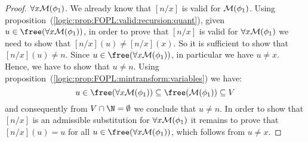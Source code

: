 \begin{proof}
$\forall x{\cal M}(\phi_{1})$. We already know that $[n/x]$ is valid
for ${\cal M}(\phi_{1})$. Using
proposition~(\ref{logic:prop:FOPL:valid:recursion:quant}), given
$u\in\free(\forall x{\cal M}(\phi_{1}))$, in order to prove that
$[n/x]$ is valid for $\forall x{\cal M}(\phi_{1})$ we need to show
that $[n/x](u)\neq[n/x](x)$. So it is sufficient to show that
$[n/x](u)\neq n$. Since $u\in\free(\forall x{\cal M}(\phi_{1}))$, in
particular we have $u\neq x$. Hence, we have to show that $u\neq n$.
Using proposition~(\ref{logic:prop:FOPL:mintransform:variables}) we
have:
    \[
    u\in\free(\forall x{\cal M}(\phi_{1}))\subseteq\free({\cal M}(\phi_{1}))\subseteq V
    \]
and consequently from $V\cap\N=\emptyset$ we conclude that $u\neq
n$. In order to show that  $[n/x]$ is an admissible substitution for
$\forall x{\cal M}(\phi_{1})$ it remains to prove that $[n/x](u)=u$
for all $u\in\free(\forall x{\cal M}(\phi_{1}))$, which follows from
$u\neq x$.
\end{proof}
